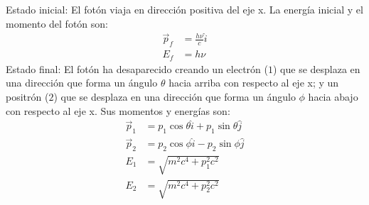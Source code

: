 \documentclass{beamer}
\begin{document}
\begin{frame}{}
    Estado inicial: El fotón viaja en direcci\'on positiva del eje x. La energ\'ia inicial y el momento del fotón son:
        \begin{equation*}
        \begin{split}
            \Vec{p}_f &= \frac{h\nu}{c} \hat{i}\\
            E_f &= h\nu
        \end{split}
        \end{equation*}
    Estado final: El fotón ha desaparecido creando un electr\'on ($1$) que se desplaza en una direcci\'on que forma un \'angulo $\theta$ hacia arriba con respecto al eje x; y un positr\'on ($2$) que se desplaza en una direcci\'on que forma un \'angulo $\phi$ hacia abajo con respecto al eje x. Sus momentos y energ\'ias son:
        \begin{equation*}
        \begin{split}
            \Vec{p}_1 &= p_1\cos{\theta} \hat{i} + p_1\sin{\theta}\hat{j}\\
            \Vec{p}_2 &= p_2\cos{\phi} \hat{i} - p_2\sin{\phi}\hat{j}\\
            E_1 &= \sqrt{m^2c^4 + p^2_1c^2}\\
            E_2 &= \sqrt{m^2c^4 + p^2_2c^2}
        \end{split}
        \end{equation*}
\end{frame}
\end{document}
